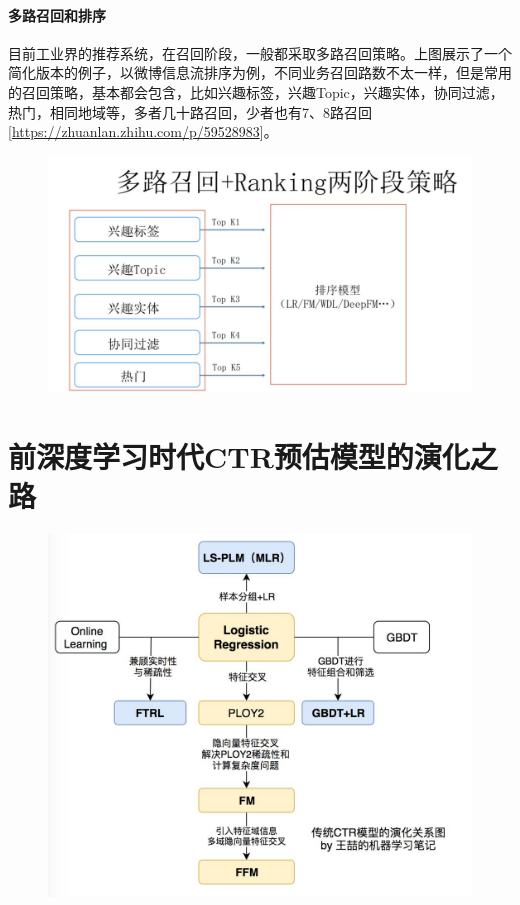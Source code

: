 \documentclass[12pt]{article}
\begin{document}
\subsection{多路召回和排序}
目前工业界的推荐系统，在召回阶段，一般都采取多路召回策略。上图展示了一个简化版本的例子，以微博信息流排序为例，不同业务召回路数不太一样，但是常用的召回策略，基本都会包含，比如兴趣标签，兴趣Topic，兴趣实体，协同过滤，热门，相同地域等，多者几十路召回，少者也有7、8路召回[\url{https://zhuanlan.zhihu.com/p/59528983}]。
\begin{figure}[H]
    \centering
    \includegraphics[width=.6\textwidth]{fig/Recall_Candidates_Multi_Methods_And_Rank.png}
\end{figure}


\part{前深度学习时代CTR预估模型的演化之路}
\begin{figure}[H]
    \centering
    \includegraphics[width=1\textwidth]{fig/Traditional_CTR_Model_Evolution.jpg}
\end{figure}
\end{document}
